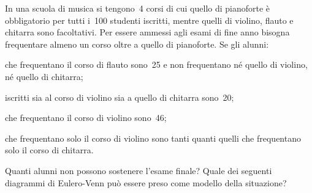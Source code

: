 \begin{esercizio}[\Ast]
 \label{ese:\thechapter.80}
In una scuola di musica si tengono~4 corsi di cui quello di pianoforte è obbligatorio
per tutti i~100 studenti iscritti, mentre quelli di violino, flauto e
chitarra sono facoltativi. Per essere ammessi agli esami di fine anno
bisogna frequentare almeno un corso oltre a quello di pianoforte. Se gli alunni:

\begin{enumeratea}
 \item che frequentano il corso di flauto sono~25 e non frequentano né quello di violino, né quello di chitarra;
 \item iscritti sia al corso di violino sia a quello di chitarra sono~20;
 \item che frequentano il corso di violino sono~46;
 \item che frequentano solo il corso di violino sono tanti quanti quelli che frequentano solo il corso di chitarra.
\end{enumeratea}

Quanti alunni non possono sostenere l'esame finale?
Quale dei seguenti diagrammi di Eulero-Venn può essere preso come modello della situazione?
\begin{center}
 
\end{center}

\end{esercizio}
